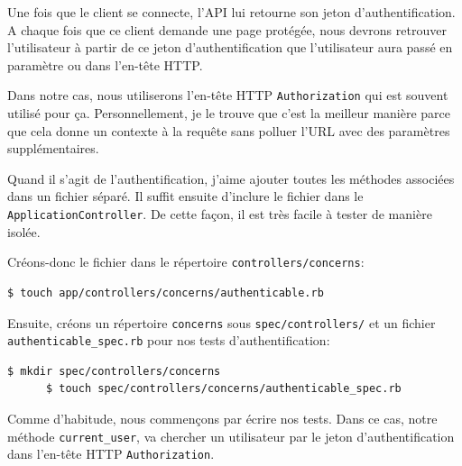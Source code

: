 \documentclass[]{report}
\begin{document}
    Une fois que le client se connecte, l'API lui retourne son jeton d'authentification. A chaque fois que ce client demande une page protégée, nous devrons retrouver l'utilisateur à partir de ce jeton d'authentification que l'utilisateur aura passé en paramètre ou dans l'en-tête HTTP.

    Dans notre cas, nous utiliserons l'en-tête HTTP \verb|Authorization| qui est souvent utilisé pour ça. Personnellement, je le trouve que c'est la meilleur manière parce que cela donne un contexte à la requête sans polluer l'URL avec des paramètres supplémentaires.

    Quand il s'agit de l'authentification, j'aime ajouter toutes les méthodes associées dans un fichier séparé. Il suffit ensuite d'inclure le fichier dans le \verb|ApplicationController|. De cette façon, il est très facile à tester de manière isolée.

    Créons-donc le fichier dans le répertoire \verb|controllers/concerns|:

    \begin{scriptsize}
      \begin{lstlisting}[language=bash]
      $ touch app/controllers/concerns/authenticable.rb
      \end{lstlisting}
    \end{scriptsize}

    Ensuite, créons un répertoire \verb|concerns| sous \verb|spec/controllers/| et un fichier \verb|authenticable_spec.rb| pour nos tests d'authentification:

    \begin{scriptsize}
      \begin{lstlisting}[language=bash]
      $ mkdir spec/controllers/concerns
      $ touch spec/controllers/concerns/authenticable_spec.rb
      \end{lstlisting}
    \end{scriptsize}

    Comme d'habitude, nous commençons par écrire nos tests. Dans ce cas, notre méthode \verb|current_user|, va chercher un utilisateur par le jeton d'authentification dans l'en-tête HTTP \verb|Authorization|.
\end{document}
